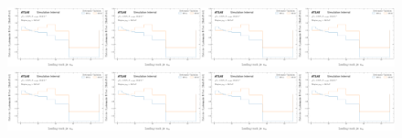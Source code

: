 \begin{figure}[h!]
\centering
\includegraphics[width=0.25\textwidth,page=1]{figures/SimResults/MultiFold_QCD_SystEffect.pdf}\includegraphics[width=0.25\textwidth,page=2]{figures/SimResults/MultiFold_QCD_SystEffect.pdf}\includegraphics[width=0.25\textwidth,page=3]{figures/SimResults/MultiFold_QCD_SystEffect.pdf}\includegraphics[width=0.25\textwidth,page=4]{figures/SimResults/MultiFold_QCD_SystEffect.pdf}\\
\includegraphics[width=0.25\textwidth,page=5]{figures/SimResults/MultiFold_QCD_SystEffect.pdf}\includegraphics[width=0.25\textwidth,page=6]{figures/SimResults/MultiFold_QCD_SystEffect.pdf}\includegraphics[width=0.25\textwidth,page=7]{figures/SimResults/MultiFold_QCD_SystEffect.pdf}\includegraphics[width=0.25\textwidth,page=8]{figures/SimResults/MultiFold_QCD_SystEffect.pdf}\\

\end{figure}
